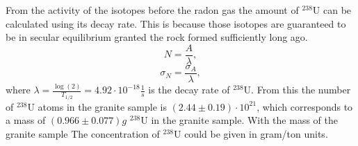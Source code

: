 \documentclass[pdftex,12pt,a4paper]{article}
\begin{document}
		From the activity of the isotopes before the radon gas the amount of $^{238}\text{U}$ can be calculated using its decay rate. This is because those isotopes are guaranteed to be in secular equilibrium granted the rock formed sufficiently long ago.
		\begin{equation}
			N = \frac{A}{\lambda},
		\end{equation}
		\begin{equation}
			\sigma_N = \frac{\sigma_A}{\lambda},
		\end{equation}
		where $\lambda = \frac{\log(2)}{T_{1/2}} = 4.92\cdot 10^{-18}\frac{1}{s}$ is the decay rate of $^{238}\text{U}$. From this the number of $^{238}\text{U}$ atoms in the granite sample is $(2.44\pm0.19)\cdot 10^{21}$, which corresponds to a mass of $(0.966\pm0.077)g$ $^{238}\text{U}$ in the granite sample. With the mass of the granite sample The concentration of $^{238}\text{U}$ could be given in gram/ton units.
\end{document}
